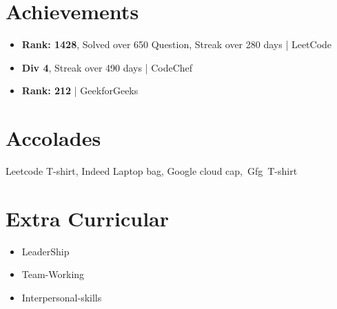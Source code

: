 \documentclass[letterpaper,11pt]{article}
\newcommand{\resumeItem}[1]{
  \item\small{
    {#1 \vspace{-3pt}}
  }
}
\newcommand{\resumeItemListStart}{\begin{itemize}}
\newcommand{\resumeItemListEnd}{\end{itemize}\vspace{0pt}}
\begin{document}
\section{Achievements}
    \resumeItemListStart
        \resumeItem{ \textbf{Rank: 1428}, Solved over 650 Question, Streak over 280 days | LeetCode }
        \resumeItem{ \textbf{Div 4}, Streak over 490 days | CodeChef }
        \resumeItem{ \textbf{Rank: 212} | GeekforGeeks }
    \resumeItemListEnd

\section{Accolades}
    Leetcode T-shirt, Indeed Laptop bag, Google cloud cap, Gfg T-shirt
    \vspace{3pt}
\section{Extra Curricular}
    \resumeItemListStart
        \resumeItem{ LeaderShip}
        \resumeItem{ Team-Working }
        \resumeItem{ Interpersonal-skills }
    \resumeItemListEnd
    
\end{document}
